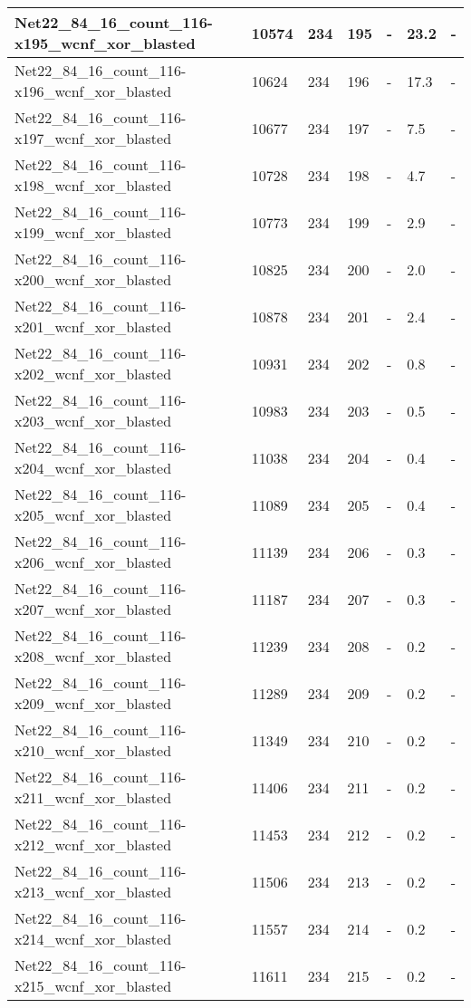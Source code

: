 \begin{scriptsize}
\begin{longtable}{|p{5cm}|l|l|l|l|l|l|}
Net22\_84\_16\_count\_116-x195\_wcnf\_xor\_blasted&10574&234&195&-&23.2&- \\ \hline 
Net22\_84\_16\_count\_116-x196\_wcnf\_xor\_blasted&10624&234&196&-&17.3&- \\ \hline 
Net22\_84\_16\_count\_116-x197\_wcnf\_xor\_blasted&10677&234&197&-&7.5&- \\ \hline 
Net22\_84\_16\_count\_116-x198\_wcnf\_xor\_blasted&10728&234&198&-&4.7&- \\ \hline 
Net22\_84\_16\_count\_116-x199\_wcnf\_xor\_blasted&10773&234&199&-&2.9&- \\ \hline 
Net22\_84\_16\_count\_116-x200\_wcnf\_xor\_blasted&10825&234&200&-&2.0&- \\ \hline 
Net22\_84\_16\_count\_116-x201\_wcnf\_xor\_blasted&10878&234&201&-&2.4&- \\ \hline 
Net22\_84\_16\_count\_116-x202\_wcnf\_xor\_blasted&10931&234&202&-&0.8&- \\ \hline 
Net22\_84\_16\_count\_116-x203\_wcnf\_xor\_blasted&10983&234&203&-&0.5&- \\ \hline 
Net22\_84\_16\_count\_116-x204\_wcnf\_xor\_blasted&11038&234&204&-&0.4&- \\ \hline 
Net22\_84\_16\_count\_116-x205\_wcnf\_xor\_blasted&11089&234&205&-&0.4&- \\ \hline 
Net22\_84\_16\_count\_116-x206\_wcnf\_xor\_blasted&11139&234&206&-&0.3&- \\ \hline 
Net22\_84\_16\_count\_116-x207\_wcnf\_xor\_blasted&11187&234&207&-&0.3&- \\ \hline 
Net22\_84\_16\_count\_116-x208\_wcnf\_xor\_blasted&11239&234&208&-&0.2&- \\ \hline 
Net22\_84\_16\_count\_116-x209\_wcnf\_xor\_blasted&11289&234&209&-&0.2&- \\ \hline 
Net22\_84\_16\_count\_116-x210\_wcnf\_xor\_blasted&11349&234&210&-&0.2&- \\ \hline 
Net22\_84\_16\_count\_116-x211\_wcnf\_xor\_blasted&11406&234&211&-&0.2&- \\ \hline 
Net22\_84\_16\_count\_116-x212\_wcnf\_xor\_blasted&11453&234&212&-&0.2&- \\ \hline 
Net22\_84\_16\_count\_116-x213\_wcnf\_xor\_blasted&11506&234&213&-&0.2&- \\ \hline 
Net22\_84\_16\_count\_116-x214\_wcnf\_xor\_blasted&11557&234&214&-&0.2&- \\ \hline 
Net22\_84\_16\_count\_116-x215\_wcnf\_xor\_blasted&11611&234&215&-&0.2&- \\ \hline 

\end{longtable}
\end{scriptsize}
